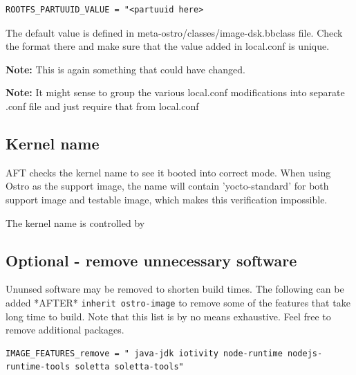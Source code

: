 \documentclass[a4paper,11pt]{article}
\newcommand{\note}{\textbf{Note: }}
\newcommand{\cmd}[1]{\texttt{#1}}
\begin{document}
\begin{lstlisting}
ROOTFS_PARTUUID_VALUE = "<partuuid here>
\end{lstlisting}

The default value is defined in meta-ostro/classes/image-dsk.bbclass file. Check the format there and make sure that the value added in local.conf is unique.


\note This is again something that could have changed.

\note It might sense to group the various local.conf modifications into separate .conf file and just require that from local.conf

\subsection*{Kernel name}

AFT checks the kernel name to see it booted into correct mode. When using Ostro as the support image, the name will contain 'yocto-standard' for both support image and testable image, which makes this verification impossible.

The kernel name is controlled by 


\subsection*{Optional - remove unnecessary software}

Ununsed software may be removed to shorten build times. The following can be added *AFTER* \cmd{inherit ostro-image} to remove some of the features that take long time to build. Note that this list is by no means exhaustive. Feel free to remove additional packages.

\begin{lstlisting}
IMAGE_FEATURES_remove = " java-jdk iotivity node-runtime nodejs-runtime-tools soletta soletta-tools"
\end{lstlisting}
\end{document}
